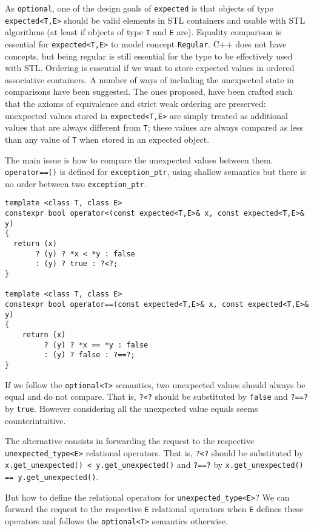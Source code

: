 \documentclass[a4paper,10pt]{article}
\newcommand{\cpp}[1]{\lstinline{#1}}
\begin{document}
As \cpp{optional}, one of the design goals of \cpp{expected} is that objects of type \cpp{expected<T,E>} should be valid elements in STL containers and usable with STL algorithms (at least if objects of type \cpp{T} and \cpp{E} are). Equality comparison is essential for \cpp{expected<T,E>} to model concept \cpp{Regular}. C++ does not have concepts, but being regular is still essential for the type to be effectively used with STL. Ordering is essential if we want to store expected values in ordered associative containers. A number of ways of including the unexpected state in comparisons have been suggested. The ones proposed, have been crafted such that the axioms of equivalence and strict weak ordering are preserved: unexpected values stored in \cpp{expected<T,E>} are simply treated as additional values that are always different from \cpp{T}; these values are always compared as less than any value of \cpp{T} when stored in an expected object. 

The main issue is how to compare the unexpected values between them.  \cpp{operator==()} is defined for \cpp{exception_ptr}, using shallow semantics but there is no order between two \cpp{exception_ptr}.

\begin{lstlisting}
template <class T, class E>
constexpr bool operator<(const expected<T,E>& x, const expected<T,E>& y)
{
  return (x)
       ? (y) ? *x < *y : false
       : (y) ? true : ?<?;
}

template <class T, class E>
constexpr bool operator==(const expected<T,E>& x, const expected<T,E>& y)
{
    return (x)
         ? (y) ? *x == *y : false
         : (y) ? false : ?==?;
}
\end{lstlisting}

If we follow the \cpp{optional<T>} semantics, two unexpected values should always be equal and do not compare. That is, \cpp{?<?} should be substituted by \cpp{false} and \cpp{?==?} by \cpp{true}. However considering all the unexpected value equals seems counterintuitive.

The alternative consists in forwarding the request to the respective  \cpp{unexpected_type<E>} relational operators. That is, \cpp{?<?} should be substituted by \cpp{x.get_unexpected() < y.get_unexpected()} and \cpp{?==?} by \cpp{x.get_unexpected()} \cpp{== y.get_unexpected()}. 

But how to define the relational operators for \cpp{unexpected_type<E>}? We can forward the request to the respective \cpp{E} relational operators when \cpp{E} defines these operators and follows the \cpp{optional<T>} semantics otherwise. 
\end{document}
